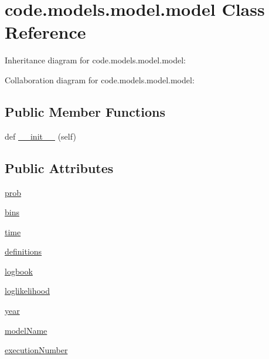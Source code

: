 \hypertarget{classcode_1_1models_1_1model_1_1model}{}\section{code.\+models.\+model.\+model Class Reference}
\label{classcode_1_1models_1_1model_1_1model}


Inheritance diagram for code.\+models.\+model.\+model\+:


Collaboration diagram for code.\+models.\+model.\+model\+:
\subsection*{Public Member Functions}
\begin{DoxyCompactItemize}
\item 
def \hyperlink{classcode_1_1models_1_1model_1_1model_a57f300b026088203a74fc7eb093d1ce8}{\+\_\+\+\_\+init\+\_\+\+\_\+} (self)
\end{DoxyCompactItemize}
\subsection*{Public Attributes}
\begin{DoxyCompactItemize}
\item 
\hyperlink{classcode_1_1models_1_1model_1_1model_ae0c16904c5fd80cd92fb5466f0ea5ab5}{prob}
\item 
\hyperlink{classcode_1_1models_1_1model_1_1model_a848482cacf97b2087e82ca4004af20b3}{bins}
\item 
\hyperlink{classcode_1_1models_1_1model_1_1model_ad6a5095c00c3d7cf0d61d3f028db0ce0}{time}
\item 
\hyperlink{classcode_1_1models_1_1model_1_1model_a3ce7471348562b088db1143e57f9acc3}{definitions}
\item 
\hyperlink{classcode_1_1models_1_1model_1_1model_a1475e43d95e81a0d425eeade8e65f9f7}{logbook}
\item 
\hyperlink{classcode_1_1models_1_1model_1_1model_acdc25d9523c269c6ffbffeee6e21a018}{loglikelihood}
\item 
\hyperlink{classcode_1_1models_1_1model_1_1model_ac9619b942cec2ddaa57336fbb3805d21}{year}
\item 
\hyperlink{classcode_1_1models_1_1model_1_1model_af7d138b883b594eb8c954185289ddc52}{model\+Name}
\item 
\hyperlink{classcode_1_1models_1_1model_1_1model_a1e0537e731b011ba9faed3c716ee9808}{execution\+Number}
\end{DoxyCompactItemize}


